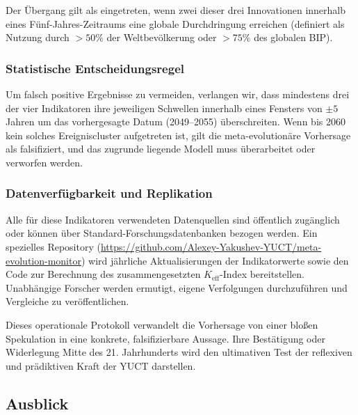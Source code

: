 \documentclass[12pt,a4paper]{article}
\theoremstyle{remark}
\begin{document}
	Der Übergang gilt als eingetreten, wenn zwei dieser drei Innovationen innerhalb eines Fünf-Jahres-Zeitraums eine globale Durchdringung erreichen (definiert als Nutzung durch $>50\%$ der Weltbevölkerung oder $>75\%$ des globalen BIP).
	
	\subsubsection{Statistische Entscheidungsregel}
	
	Um falsch positive Ergebnisse zu vermeiden, verlangen wir, dass mindestens drei der vier Indikatoren ihre jeweiligen Schwellen innerhalb eines Fensters von $\pm 5$ Jahren um das vorhergesagte Datum (2049–2055) überschreiten. Wenn bis 2060 kein solches Ereigniscluster aufgetreten ist, gilt die meta-evolutionäre Vorhersage als falsifiziert, und das zugrunde liegende Modell muss überarbeitet oder verworfen werden.
	
	\subsubsection{Datenverfügbarkeit und Replikation}
	
	Alle für diese Indikatoren verwendeten Datenquellen sind öffentlich zugänglich oder können über Standard-Forschungsdatenbanken bezogen werden. Ein spezielles Repository (\url{https://github.com/Alexey-Yakushev-YUCT/meta-evolution-monitor}) wird jährliche Aktualisierungen der Indikatorwerte sowie den Code zur Berechnung des zusammengesetzten $K_{\text{eff}}$-Index bereitstellen. Unabhängige Forscher werden ermutigt, eigene Verfolgungen durchzuführen und Vergleiche zu veröffentlichen.
	
	Dieses operationale Protokoll verwandelt die Vorhersage von einer bloßen Spekulation in eine konkrete, falsifizierbare Aussage. Ihre Bestätigung oder Widerlegung Mitte des 21. Jahrhunderts wird den ultimativen Test der reflexiven und prädiktiven Kraft der YUCT darstellen.
	
	\subsection*{Ausblick}
	
\end{document}
